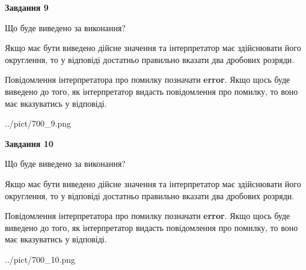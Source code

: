 \documentclass[12pt, ukrainian]{article}
\begin{document}
{\begin {Large}
{\begin {center}\textbf{Завдання 9}\end {center}}\par
Що буде виведено за виконання? \par

Якщо має бути виведено дійсне значення та інтерпретатор має здійснювати його округлення, 
то у відповіді достатньо правильно вказати два дробових розряди.

Повідомлення інтерпретатора про помилку позначати \textbf{error}.
Якщо щось буде виведено до того, як інтерпретатор видасть повідомлення про помилку, 
то воно має вказуватись у відповіді. \par

\begin{center}
	{../pict/700_9.png}
\end{center}
\newpage

{\begin {center}\textbf{Завдання 10}\end {center}}\par
Що буде виведено за виконання? \par

Якщо має бути виведено дійсне значення та інтерпретатор має здійснювати його округлення, 
то у відповіді достатньо правильно вказати два дробових розряди.

Повідомлення інтерпретатора про помилку позначати \textbf{error}.
Якщо щось буде виведено до того, як інтерпретатор видасть повідомлення про помилку, 
то воно має вказуватись у відповіді. \par

\begin{center}
	{../pict/700_10.png}
\end{center}
\newpage

\end {Large}}
\end{document}
